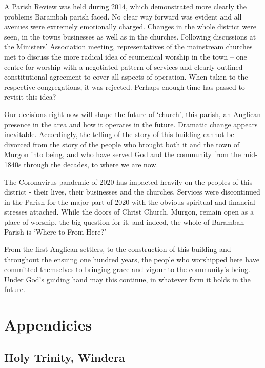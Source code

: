 A Parish Review was held during 2014, which demonstrated more clearly the problems Barambah parish faced. No clear way forward was evident and all avenues were extremely emotionally charged. Changes in the whole district were seen, in the towns businesses as well as in the churches. Following discussions at the Ministers' Association meeting, representatives of the mainstream churches met to discuss the more radical idea of ecumenical worship in the town -- one centre for worship with a negotiated pattern of services and clearly outlined constitutional agreement to cover all aspects of operation. When taken to the respective congregations, it was rejected. Perhaps enough time has passed to revisit this idea?

Our decisions right now will shape the future of `church', this parish, an Anglican presence in the area and how it operates in the future. Dramatic change appears inevitable. Accordingly, the telling of the story of this building cannot be divorced from the story of the people who brought both it and the town of Murgon into being, and who have served God and the community from the mid-1840s through the decades, to where we are now.

The Coronavirus pandemic of 2020 has impacted heavily on the peoples of this district - their lives, their businesses and the churches. Services were discontinued in the Parish for the major part of 2020 with the obvious spiritual and financial stresses attached. While the doors of Christ Church, Murgon, remain open as a place of worship, the big question for it, and indeed, the whole of Barambah Parish is `Where to From Here?'

From the first Anglican settlers, to the construction of this building and throughout the ensuing one hundred years, the people who worshipped here have committed themselves to bringing grace and vigour to the community's being. Under God's guiding hand may this continue, in whatever form it holds in the future.

\hypertarget{appendicies}{%
\chapter{Appendicies}\label{appendicies}}

\hypertarget{holy-trinity-windera-1}{%
\section{Holy Trinity, Windera}\label{holy-trinity-windera-1}}

